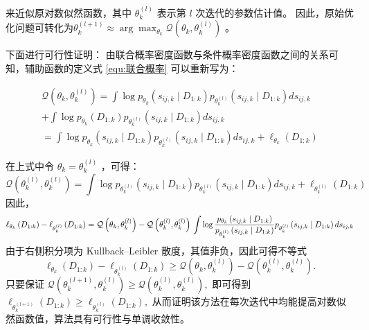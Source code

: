 来近似原对数似然函数，其中  $\theta_{k}^{(l)}$  表示第  $l $ 次迭代的参数估计值。
因此，原始优化问题可转化为$\theta_{k}^{(l+1)} \approx \arg \max _{\theta_{k}} \mathcal{Q}\left(\theta_{k}, \theta_{k}^{(l)}\right)$ 。

下面进行可行性证明：
由联合概率密度函数与条件概率密度函数之间的关系可知，辅助函数的定义式 \ref{equ:联合概率} 可以重新写为：

\begin{equation}
\begin{array}{c}
\mathcal{Q}\left(\theta_{k}, \theta_{k}^{(l)}\right)=\int \log p_{\theta_{k}}\left(s_{i j, k} \mid D_{1: k}\right) p_{\theta_{k}^{(l)}}\left(s_{i j, k} \mid D_{1: k}\right) d s_{i j, k} \\
+\int \log p_{\theta_{k}}\left(D_{1: k}\right) p_{\theta_{k}^{(l)}}\left(s_{i j, k} \mid D_{1: k}\right) d s_{i j, k} \\
=\int \log p_{\theta_{k}}\left(s_{i j, k} \mid D_{1: k}\right) p_{\theta_{k}^{(l)}}\left(s_{i j, k} \mid D_{1: k}\right) d s_{i j, k}+\ell_{\theta_{k}}\left(D_{1: k}\right)
\end{array}
\end{equation}

在上式中令 $\theta_{k}=\theta_{k}^{(l)}$ ，可得：
\begin{equation}
\mathcal{Q}\left(\theta_{k}^{(l)}, \theta_{k}^{(l)}\right)=\int \log p_{\theta_{k}^{(l)}}\left(s_{i j, k} \mid D_{1: k}\right) p_{\theta_{k}^{(l)}}\left(s_{i j, k} \mid D_{1: k}\right) d s_{i j, k}+\ell_{\theta_{k}^{(l)}}\left(D_{1: k}\right)
\end{equation}
因此，
\begin{equation}
 \ell_{\theta_{k}}\left(D_{1: k}\right)-\ell_{\theta_{k}^{(l)}}\left(D_{1: k}\right)=\mathcal{Q}\left(\theta_{k}, \theta_{k}^{(l)}\right)-\mathcal{Q}\left(\theta_{k}^{(l)}, \theta_{k}^{(l)}\right) \\
\int \log \frac{p_{\theta_{k}}\left(s_{i j, k} \mid D_{1: k}\right)}{p_{\theta_{k}^{(l)}}\left(s_{i j, k} \mid D_{1: k}\right)} p_{\theta_{k}^{(l)}}\left(s_{i j, k} \mid D_{1: k}\right) d s_{i j, k}
\end{equation}
由于右侧积分项为 Kullback–Leibler 散度\cite{huang2017novel, tzikas2008variational}，其值非负，因此可得不等式
\begin{equation}
\ell_{\theta_{k}}\left(D_{1: k}\right)-\ell_{\theta_{k}^{(l)}}\left(D_{1: k}\right) \geq \mathcal{Q}\left(\theta_{k}, \theta_{k}^{(l)}\right)-\mathcal{Q}\left(\theta_{k}^{(l)}, \theta_{k}^{(l)}\right) .
\end{equation}
只要保证
$\mathcal{Q}\left(\theta_{k}^{(l+1)}, \theta_{k}^{(l)}\right) \geq \mathcal{Q}\left(\theta_{k}^{(l)}, \theta_{k}^{(l)}\right),$
即可得到$\ell_{\theta_{k}^{(l+1)}}\left(D_{1: k}\right) \geq \ell_{\theta_{k}^{(l)}}\left(D_{1: k}\right),$
从而证明该方法在每次迭代中均能提高对数似然函数值，算法具有可行性与单调收敛性。

